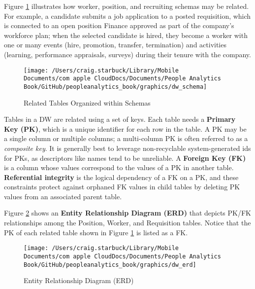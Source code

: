 \documentclass[
]{book}
\begin{document}
Figure \ref{fig:dw-schema} illustrates how worker, position, and recruiting schemas may be related. For example, a candidate submits a job application to a posted requisition, which is connected to an open position Finance approved as part of the company's workforce plan; when the selected candidate is hired, they become a worker with one or many events (hire, promotion, transfer, termination) and activities (learning, performance appraisals, surveys) during their tenure with the company.

\begin{figure}

{\centering \texttt{[image: /Users/craig.starbuck/Library/Mobile Documents/com~apple~CloudDocs/Documents/People Analytics Book/GitHub/peopleanalytics\_book/graphics/dw\_schema]} 

}

\caption{Related Tables Organized within Schemas}\label{fig:dw-schema}
\end{figure}

Tables in a DW are related using a set of keys. Each table needs a \textbf{Primary Key (PK)}, which is a unique identifier for each row in the table. A PK may be a single column or multiple columns; a multi-column PK is often referred to as a \emph{composite key}. It is generally best to leverage non-recyclable system-generated ids for PKs, as descriptors like names tend to be unreliable. A \textbf{Foreign Key (FK)} is a column whose values correspond to the values of a PK in another table. \textbf{Referential integrity} is the logical dependency of a FK on a PK, and these constraints protect against orphaned FK values in child tables by deleting PK values from an associated parent table.

Figure \ref{fig:dw-erd} shows an \textbf{Entity Relationship Diagram (ERD)} that depicts PK/FK relationships among the Position, Worker, and Requisition tables. Notice that the PK of each related table shown in Figure \ref{fig:dw-schema} is listed as a FK.

\begin{figure}

{\centering \texttt{[image: /Users/craig.starbuck/Library/Mobile Documents/com~apple~CloudDocs/Documents/People Analytics Book/GitHub/peopleanalytics\_book/graphics/dw\_erd]} 

}

\caption{Entity Relationship Diagram (ERD)}\label{fig:dw-erd}
\end{figure}
\end{document}
